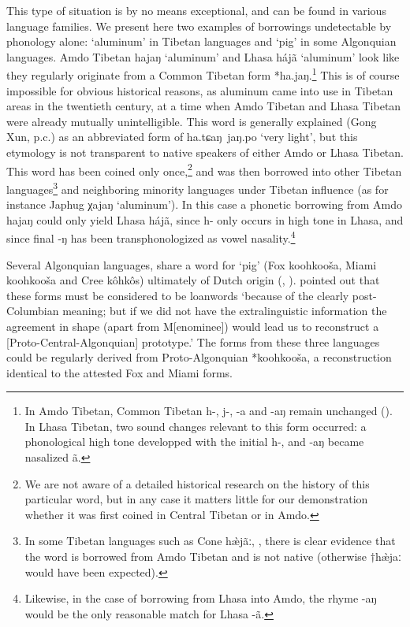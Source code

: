 \documentclass[svgnames,12pt]{scrartcl}
\newcommand{\ipa}[1]{{{\phon\mbox{#1}}}}
\begin{document}
{{This type of situation is by no means exceptional, and can be found in various language families. We present here two examples of borrowings undetectable by phonology alone: `aluminum' in Tibetan languages and `pig' in some Algonquian languages. 
Amdo Tibetan \ipa{hajaŋ} `aluminum' and Lhasa \ipa{hájã} `aluminum' look like they regularly originate from a Common Tibetan form *\ipa{ha.jaŋ}.\footnote{In Amdo Tibetan, Common Tibetan \ipa{h-}, \ipa{j-}, \ipa{-a} and \ipa{-aŋ} remain unchanged (\citealt{gong16amdo}). In Lhasa Tibetan, two sound changes relevant to this form occurred: a phonological high tone developped with the initial \ipa{h-}, and \ipa{-aŋ} became nasalized \ipa{ã}.} This is of course impossible for obvious historical reasons, as aluminum came into use in Tibetan areas in the twentieth century, at a time when Amdo Tibetan and Lhasa Tibetan were already mutually unintelligible. This word is generally explained (Gong Xun, p.c.) as an abbreviated form of \ipa{ha.tɕaŋ jaŋ.po} `very light', but this etymology is not transparent to native speakers of either Amdo or Lhasa Tibetan. This word has been coined only once,\footnote{We are not aware of a detailed historical research on the history of this particular word, but in any case it matters little for our demonstration whether it was first coined in Central Tibetan or in Amdo.} and was then borrowed into other Tibetan languages\footnote{In some Tibetan languages such as Cone \ipa{hæ̀jãː}, \citet[306]{jacques14cone}, there is clear evidence that the word is borrowed from Amdo Tibetan and is not native (otherwise $\dagger$\ipa{hæ̀jaː} would have been expected). } and neighboring minority languages under Tibetan influence (as for instance Japhug \ipa{χajaŋ} `aluminum').
In this case a phonetic borrowing from Amdo \ipa{hajaŋ} could only yield Lhasa \ipa{hájã}, since \ipa{h-} only occurs in high tone in Lhasa, and since final \ipa{-ŋ} has been transphonologized as vowel nasality.\footnote{Likewise, in the case of borrowing from Lhasa into Amdo, the rhyme \ipa{-aŋ} would be the only reasonable match for Lhasa \ipa{-ã}.} 

Several Algonquian languages, share a word for `pig' (Fox \ipa{koohkooša}, Miami \ipa{koohkooša} and Cree \ipa{kôhkôs}) ultimately of Dutch origin (\citealt{goddard74dutch}, \citealt{costa13borrowing}). \citet[266]{hockett57k} pointed out that these forms must be considered to be loanwords `because of the clearly post-Columbian meaning; but if we did not have the extralinguistic information the agreement in shape (apart from M[enominee]) would lead us to reconstruct a [Proto-Central-Algonquian] prototype.' The forms from these three languages could be regularly derived from Proto-Algonquian *\ipa{koohkooša}, a reconstruction identical to the attested Fox and Miami forms.

}}
\end{document}
